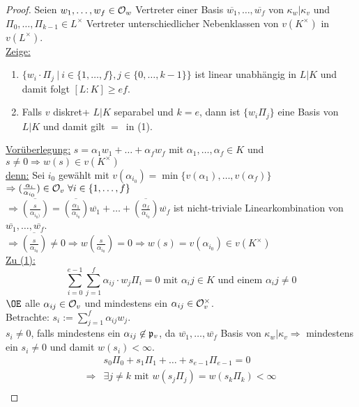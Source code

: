 
\begin{proof}
Seien $w_1, \dots, w_f \in \mathcal{O}_w$ Vertreter einer Basis $\overline{w_1}, \dots, \overline{w_f}$ von $\kappa_w | \kappa_v$ und $\Pi_0, \dots, \Pi_{k-1} \in L^\times $ Vertreter unterschiedlicher Nebenklassen von $v(K^\times)$ in $v(L^\times)$.\\
\underline{Zeige:} \begin{enumerate}[(1)]
\item $\{w_i \cdot \Pi_j \ | \ i \in \{1, \dots, f\}, j \in \{0 , \dots, k-1\}\}$ ist linear unabhängig in $L|K$ und damit folgt $[L:K] \geq ef$.
\item Falls $v$ diskret+ $L|K$ separabel und $k=e$, dann ist $\{w_i\Pi_j\}$ eine Basis von $L|K$ und damit gilt \glqq $=$\grqq \ in (1).
\end{enumerate}
\underline{Vorüberlegung:} $s=\alpha_1w_1 + \dots + \alpha_f w_f$ mit $\alpha_1, \dots, \alpha_f \in K$ und $s \neq 0 \Rightarrow w(s) \in v(K^\times)$\\
\underline{denn:} Sei $i_0$ gewählt mit $v(\alpha_{i_0})=\min\{v(\alpha_1), \dots, v(\alpha_f)\}$\\
$\Rightarrow (\frac{\alpha_i}{\alpha_{i_0}}) \in \mathcal{O}_v \ \forall i \in \{1, \dots, f\}$\\
$\Rightarrow \overline{(\frac{s}{\alpha_{i_0)}})}=\overline{(\frac{\alpha_1}{\alpha_{i_0}})}\overline{w_1}+\dots+\overline{(\frac{\alpha_f}{\alpha_{i_0}})} \overline{w_f}$ ist nicht-triviale Linearkombination von $\overline{w_1}, \dots, \overline{w_f}$.\\
$\Rightarrow \overline{(\frac{s}{\alpha_{i_0}})}\neq 0 \Rightarrow w(\frac{s}{\alpha_{i_0}})=0 \Rightarrow w(s)=v(\alpha_{i_0}) \in v(K^\times)$\\
\underline{Zu (1):}
\[\sum_{i=0}^{e-1}\sum_{j=1}^f \alpha_{ij} \cdot w_j \Pi_i = 0 \text{ mit } \alpha_ij \in K \text{ und einem } \alpha_ij \neq 0\]
$\OE$ alle $\alpha_{ij} \in \mathcal{O}_v$ und mindestens ein $\alpha_{ij} \in \mathcal{O}_v^\times$.\\
Betrachte: $s_i:=\sum_{j=1}^f \alpha_{ij} w_j$.\\
$s_i \neq 0$, falls mindestens ein $\alpha_{ij} \not \in \mathfrak{p}_v$, da $\overline{w_1}, \dots, \overline{w_f}$ Basis von $\kappa_w | \kappa_v \Rightarrow$ mindestens ein $s_i \neq 0$ und damit $w(s_i)< \infty$.
\begin{align*}
&s_0\Pi_0+s_1\Pi_1+\ldots+s_{e-1}\Pi_{e-1}=0\\
\Rightarrow & \exists j \neq k \text{ mit } w(s_j \Pi_j)=w(s_k \Pi_k) < \infty\\

\end{align*}
\end{proof}
